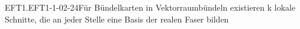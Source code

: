 \begin{REM}{EFT1.EFT1-1-02-24}{Für Bündelkarten in Vektorraumbündeln existieren k lokale Schnitte, die an jeder Stelle eine Basis der realen Faser bilden}

\end{REM}
